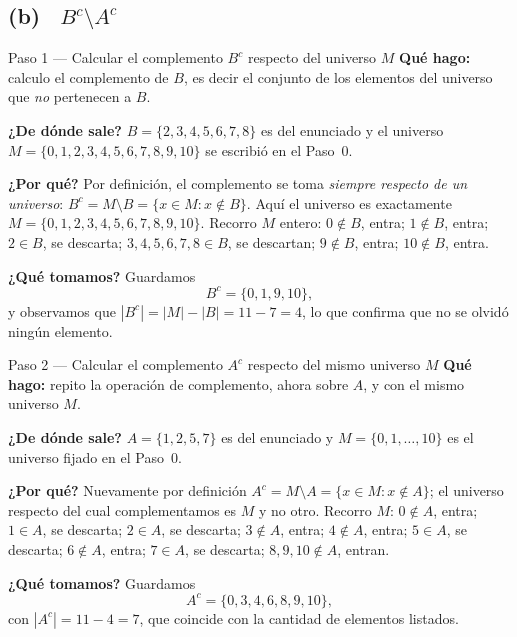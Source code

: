 \documentclass[11pt]{article}
\begin{document}
\subsection*{(b) \ $B^{c}\setminus A^{c}$}

\begin{paso}{Paso 1 --- Calcular el complemento $B^{c}$ respecto del universo $M$}
\textbf{Qué hago:} calculo el complemento de $B$, es decir el conjunto de los elementos del
universo que \emph{no} pertenecen a $B$.

\textbf{¿De dónde sale?} $B=\{2,3,4,5,6,7,8\}$ es del enunciado y el universo
$M=\{0,1,2,3,4,5,6,7,8,9,10\}$ se escribió en el Paso~0.

\textbf{¿Por qué?} Por definición, el complemento se toma \emph{siempre respecto de un
universo}: $B^{c}=M\setminus B=\{x\in M: x\notin B\}$. Aquí el universo es exactamente
$M=\{0,1,2,3,4,5,6,7,8,9,10\}$. Recorro $M$ entero: $0\notin B$, entra; $1\notin B$, entra;
$2\in B$, se descarta; $3,4,5,6,7,8\in B$, se descartan; $9\notin B$, entra;
$10\notin B$, entra.

\textbf{¿Qué tomamos?} Guardamos
\[
B^{c}=\{0,1,9,10\},
\]
y observamos que $|B^{c}|=|M|-|B|=11-7=4$, lo que confirma que no se olvidó ningún elemento.
\end{paso}

\begin{paso}{Paso 2 --- Calcular el complemento $A^{c}$ respecto del mismo universo $M$}
\textbf{Qué hago:} repito la operación de complemento, ahora sobre $A$, y con el mismo
universo $M$.

\textbf{¿De dónde sale?} $A=\{1,2,5,7\}$ es del enunciado y $M=\{0,1,\dots,10\}$ es el
universo fijado en el Paso~0.

\textbf{¿Por qué?} Nuevamente por definición $A^{c}=M\setminus A=\{x\in M: x\notin A\}$; el
universo respecto del cual complementamos es $M$ y no otro. Recorro $M$: $0\notin A$, entra;
$1\in A$, se descarta; $2\in A$, se descarta; $3\notin A$, entra; $4\notin A$, entra;
$5\in A$, se descarta; $6\notin A$, entra; $7\in A$, se descarta; $8,9,10\notin A$, entran.

\textbf{¿Qué tomamos?} Guardamos
\[
A^{c}=\{0,3,4,6,8,9,10\},
\]
con $|A^{c}|=11-4=7$, que coincide con la cantidad de elementos listados.
\end{paso}
\end{document}
